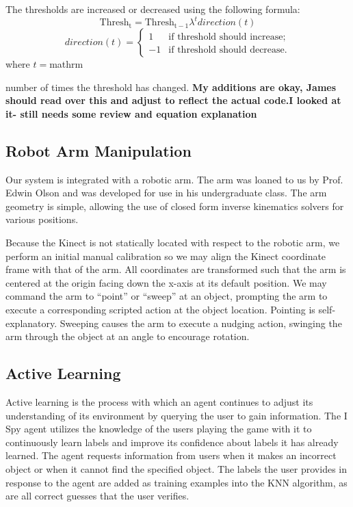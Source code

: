 \documentclass[11pt]{article}
\newcommand{\meh}[1]{{\bf \color{blue} #1}}
\begin{document}
The thresholds are increased or decreased using the following formula:
$$\mathrm{Thresh_{t}} = \mathrm{Thresh_{t-1}}  \lambda^tdirection(t)$$
\[direction(t) = \left\{ \begin{array}{ll}
         1 & \mbox{if threshold should increase};\\
         -1 & \mbox{if threshold should decrease}.\end{array} \right. \]
where $t=$mathrm{number of times the threshold has changed.
\meh{My additions are okay, James should read over this and adjust to reflect
the actual code.I looked at it- still needs some review and equation explanation}

\subsection{Robot Arm Manipulation}
Our system is integrated with a robotic arm. The arm was loaned to us by Prof.
Edwin Olson and was developed for use in his undergraduate class. The arm
geometry is simple, allowing the use of closed form inverse kinematics solvers
for various positions.

Because the Kinect is not statically located with respect to the robotic arm,
we perform an initial manual calibration so we may align the Kinect coordinate
frame with that of the arm. All coordinates are transformed such that the arm
is centered at the origin facing down the x-axis at its default position. We
may command the arm to ``point'' or ``sweep'' at an object, prompting the arm
to execute a corresponding scripted action at the object location. Pointing is
self-explanatory. Sweeping causes the arm to execute a nudging action,
swinging the arm through the object at an angle to encourage rotation.

\subsection{Active Learning}
Active learning is the process with which an agent continues to adjust its
understanding of its environment by querying the user to gain information.
The I Spy agent utilizes the knowledge of the users playing the game with it
to continuously learn labels and improve its confidence about labels it has
already learned. The agent requests information from users when it makes an
incorrect object or when it cannot find the specified object. The labels the
user provides in response to the agent are added as training examples into the
KNN algorithm, as are all correct guesses that the user verifies.

}
\end{document}
